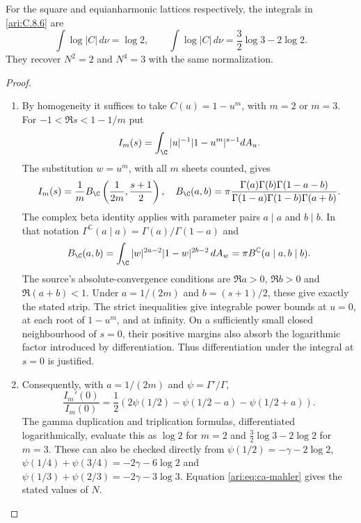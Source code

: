 \begin{proposition}\hypertarget{tag-001U}{}\label{ari:C.8.7}

For the square and equianharmonic lattices respectively, the
integrals in \ref{ari:C.8.6} are
\[
 \int\log|C|\,d\nu=\log2,\qquad
 \int\log|C|\,d\nu=\frac32\log3-2\log2.
\]
They recover $N^2=2$ and $N^4=3$ with the same normalization.
\end{proposition}


\begin{proof}
\begin{enumerate}[label=\arabic*.,leftmargin=*]
\item By homogeneity it suffices to take $C(u)=1-u^m$, with $m=2$
or $m=3$. For $-1<\Re s<1-1/m$ put
\[
 I_m(s)=\int_{\C} |u|^{-1}|1-u^m|^{s-1}dA_u.
\]
The substitution $w=u^m$, with all $m$ sheets counted, gives
\[
 I_m(s)=\frac1m B_{\C}\left(\frac1{2m},\frac{s+1}2\right),
 \quad
 B_{\C}(a,b)=\pi\frac{\Gamma(a)\Gamma(b)\Gamma(1-a-b)}
                   {\Gamma(1-a)\Gamma(1-b)\Gamma(a+b)}.
\]
The complex beta identity \cite[\S\S1.1--1.2, equations~(1.6)--(1.7),
pp.~38--39]{Neretin2024Beta} applies with parameter pairs $a\mid a$ and $b\mid b$.
In that notation $\Gamma^{\mathbb C}(a\mid a)=\Gamma(a)/\Gamma(1-a)$ and
\[
 B_{\C}(a,b)=\int_{\C}|w|^{2a-2}|1-w|^{2b-2}\,dA_w
           =\pi B^{\mathbb C}(a\mid a,b\mid b).
\]
The source's absolute-convergence conditions are
$\Re a>0$, $\Re b>0$ and $\Re(a+b)<1$. Under
$a=1/(2m)$ and $b=(s+1)/2$, these give exactly the stated strip.
The strict inequalities give integrable power bounds at $u=0$, at each
root of $1-u^m$, and at infinity. On a sufficiently small closed
neighbourhood of $s=0$, their positive margins also absorb the
logarithmic factor introduced by differentiation. Thus differentiation
under the integral at $s=0$ is justified.

\item Consequently, with $a=1/(2m)$ and $\psi=\Gamma'/\Gamma$,
\[
 \frac{I_m'(0)}{I_m(0)}
 =\frac12\left(2\psi(1/2)-\psi(1/2-a)-\psi(1/2+a)\right).
\]
The gamma duplication and triplication formulas, differentiated
logarithmically, evaluate this as $\log2$ for $m=2$ and
$\frac32\log3-2\log2$ for $m=3$. These can also be checked
directly from
$\psi(1/2)=-\gamma-2\log2$,
$\psi(1/4)+\psi(3/4)=-2\gamma-6\log2$ and
$\psi(1/3)+\psi(2/3)=-2\gamma-3\log3$.
Equation \eqref{ari:eq:ca-mahler} gives the stated values of $N$.
\end{enumerate}
\end{proof}
